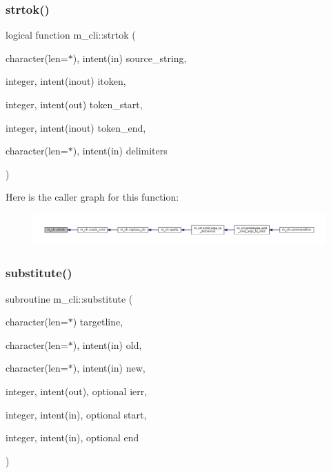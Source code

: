 \subsubsection{\texorpdfstring{strtok()}{strtok()}}
{\footnotesize\ttfamily logical function m\+\_\+cli\+::strtok (\begin{DoxyParamCaption}\item[{character(len=$\ast$), intent(in)}]{source\+\_\+string,  }\item[{integer, intent(inout)}]{itoken,  }\item[{integer, intent(out)}]{token\+\_\+start,  }\item[{integer, intent(inout)}]{token\+\_\+end,  }\item[{character(len=$\ast$), intent(in)}]{delimiters }\end{DoxyParamCaption})\hspace{0.3cm}{\ttfamily [private]}}

Here is the caller graph for this function\+:
\nopagebreak
\begin{figure}[H]
\begin{center}
\leavevmode
\includegraphics[width=350pt]{namespacem__cli_a0015c38f9fa45a58ba6ae89f2ddb54f1_icgraph}
\end{center}
\end{figure}
\mbox{\label{namespacem__cli_a3b66fe9cee0e084068051636afb2957d}} 
\subsubsection{\texorpdfstring{substitute()}{substitute()}}
{\footnotesize\ttfamily subroutine m\+\_\+cli\+::substitute (\begin{DoxyParamCaption}\item[{character(len=$\ast$)}]{targetline,  }\item[{character(len=$\ast$), intent(in)}]{old,  }\item[{character(len=$\ast$), intent(in)}]{new,  }\item[{integer, intent(out), optional}]{ierr,  }\item[{integer, intent(in), optional}]{start,  }\item[{integer, intent(in), optional}]{end }\end{DoxyParamCaption})\hspace{0.3cm}{\ttfamily [private]}}

